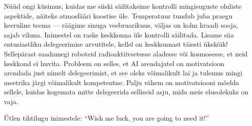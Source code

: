 Nüüd ongi küsimus, kuidas me siiski 
säilitaksime kontrolli mingisuguste oluliste aspektide, näiteks atmosfääri 
koostise üle. Temperatuur tundub juba praegu keeruline teema --- 
räägime sinuga veebruarikuus, väljas on kolm kraadi sooja, sajab vihma. 
Inimestel on raske keskkonna üle kontrolli säilitada. Lisame siia entusiastliku 
delegeerimise arvutitele, kellel on keskkonnast täiesti ükskõik! Sellepärast 
saadamegi roboteid radioaktiivsetesse aladesse või kosmosesse, et neid keskkond 
ei huvita. Probleem on selles, et AI arendajatel on motivatsioon arendada just 
nimelt delegeerimist, et see oleks võimalikult lai ja tulemus 
mingi meetrika järgi võimalikult kompetentne. Palju vähem on 
motivatsiooni mõelda sellele, kuidas kogemata mitte 
delegeerida selliseid asju, mida meie elusolekuks on vaja.


Ütlen tihtilugu inimestele: \enquote{Wish me luck, you are going to need 
it!}